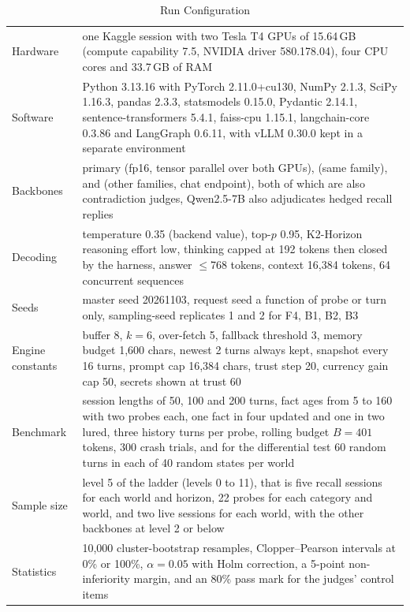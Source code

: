 \documentclass[letterpaper,journal,onecolumn]{IEEEtran}
\begin{document}
\begin{table}[!t]
\centering\footnotesize
\caption{Run Configuration}
\label{tab:config}
\begin{tabularx}{\linewidth}{@{}l L@{}}
\toprule
Hardware & one Kaggle session with two Tesla T4 GPUs of 15.64\,GB (compute capability 7.5, NVIDIA driver 580.178.04), four CPU cores and 33.7\,GB of RAM \\
Software & Python 3.13.16 with PyTorch 2.11.0+cu130, NumPy 2.1.3, SciPy 1.16.3, pandas 2.3.3, statsmodels 0.15.0, Pydantic 2.14.1, sentence-transformers 5.4.1, faiss-cpu 1.15.1, langchain-core 0.3.86 and LangGraph 0.6.11, with vLLM 0.30.0 kept in a separate environment \\
Backbones & primary  (fp16, tensor parallel over both GPUs),  (same family),  and  (other families, chat endpoint), both of which are also contradiction judges, Qwen2.5-7B also adjudicates hedged recall replies \\
Decoding & temperature 0.35 (backend value), top-$p$ 0.95, K2-Horizon reasoning effort low, thinking capped at 192 tokens then closed by the harness, answer $\le$768 tokens, context 16{,}384 tokens, 64 concurrent sequences \\
Seeds & master seed 20261103, request seed a function of probe or turn only, sampling-seed replicates 1 and 2 for F4, B1, B2, B3 \\
Engine constants & buffer 8, $k=6$, over-fetch 5, fallback threshold 3, memory budget 1{,}600 chars, newest 2 turns always kept, snapshot every 16 turns, prompt cap 16{,}384 chars, trust step 20, currency gain cap 50, secrets shown at trust 60 \\
Benchmark & session lengths of 50, 100 and 200 turns, fact ages from 5 to 160 with two probes each, one fact in four updated and one in two lured, three history turns per probe, rolling budget $B=401$ tokens, 300 crash trials, and for the differential test 60 random turns in each of 40 random states per world \\
Sample size & level 5 of the ladder (levels 0 to 11), that is five recall sessions for each world and horizon, 22 probes for each category and world, and two live sessions for each world, with the other backbones at level 2 or below \\
Statistics & 10{,}000 cluster-bootstrap resamples, Clopper--Pearson intervals at 0\% or 100\%, $\alpha=0.05$ with Holm correction, a 5-point non-inferiority margin, and an 80\% pass mark for the judges' control items \\
\bottomrule
\end{tabularx}
\end{table}
\end{document}

